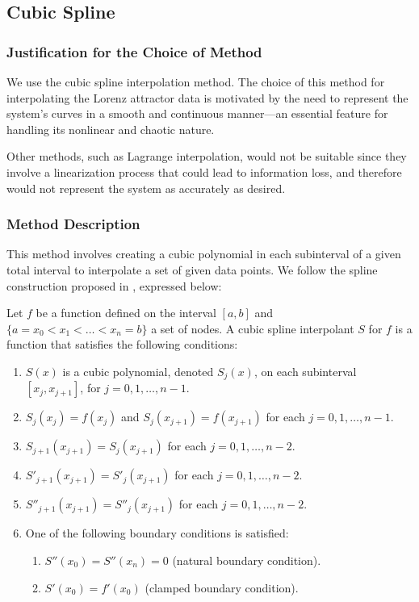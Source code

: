 \documentclass[12pt, a4paper]{article}
\begin{document}
	\subsection{Cubic Spline}
	\subsubsection{Justification for the Choice of Method}
	
	We use the cubic spline interpolation method. The choice of this method for interpolating the Lorenz attractor data is motivated by the need to represent the system’s curves in a smooth and continuous manner—an essential feature for handling its nonlinear and chaotic nature.
	
	Other methods, such as Lagrange interpolation, would not be suitable since they involve a linearization process that could lead to information loss, and therefore would not represent the system as accurately as desired.
	
	\subsubsection{Method Description}
	
	This method involves creating a cubic polynomial in each subinterval of a given total interval to interpolate a set of given data points. We follow the spline construction proposed in \cite{burden2016}, expressed below:
	
	Let $f$ be a function defined on the interval $[a,b]$ and $ \{a = x_0 < x_1 < \ldots < x_n = b\}$ a set of nodes. A cubic spline interpolant $S$ for $f$ is a function that satisfies the following conditions:
	
	\begin{enumerate}
		\item $S(x)$ is a cubic polynomial, denoted $S_j(x)$, on each subinterval $[x_j, x_{j+1}]$, for $j = 0, 1, \ldots, n-1$.
		\item $S_j(x_j) = f(x_j)$ and $S_j(x_{j+1}) = f(x_{j+1})$ for each $j = 0, 1, \ldots, n-1$.
		\item $S_{j+1}(x_{j+1}) = S_j(x_{j+1})$ for each $j = 0, 1, \ldots, n-2$.
		\item $S'_{j+1}(x_{j+1}) = S'_j(x_{j+1})$ for each $j = 0, 1, \ldots, n-2$.
		\item $S''_{j+1}(x_{j+1}) = S''_j(x_{j+1})$ for each $j = 0, 1, \ldots, n-2$.
		\item One of the following boundary conditions is satisfied:
		      \begin{enumerate}
		      	\item $S''(x_0) = S''(x_n) = 0$ (natural boundary condition).
		      	\item $S'(x_0) = f'(x_0)$ (clamped boundary condition).
		      \end{enumerate}
	\end{enumerate}
	
\end{document}
